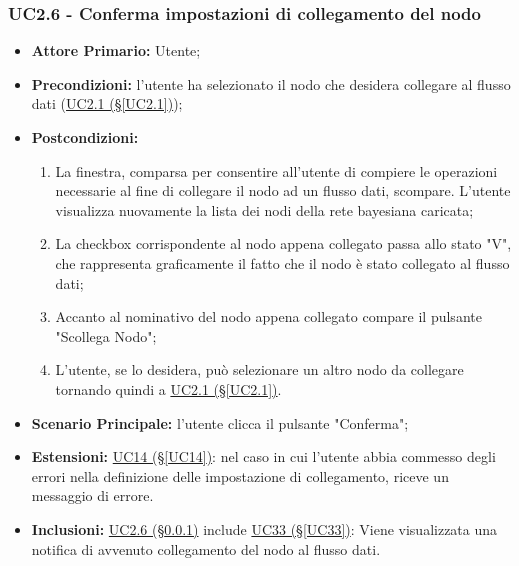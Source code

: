 \subsubsection{UC2.6 - Conferma impostazioni di collegamento del nodo}\label{UC2.6}
\begin{itemize}
\item \textbf{Attore Primario:} Utente;
\item \textbf{Precondizioni:} l'utente ha selezionato il nodo che desidera collegare al flusso dati 					(\hyperref[UC2.1]{UC2.1 (§\ref*{UC2.1})});
\item \textbf{Postcondizioni:}
	\begin{enumerate}
	\item La finestra, comparsa per consentire all'utente di compiere le operazioni necessarie al fine di collegare il 		nodo ad un flusso dati, scompare. L'utente visualizza nuovamente la lista dei nodi della rete bayesiana caricata;
	\item La checkbox corrispondente al nodo appena collegato passa allo stato "V", che rappresenta graficamente il fatto che il nodo è stato collegato al flusso dati;
	\item Accanto al nominativo del nodo appena collegato compare il pulsante "Scollega Nodo";
	\item L'utente, se lo desidera, può selezionare un altro nodo da collegare tornando quindi a \hyperref[UC2.1]{UC2.1 (§\ref*{UC2.1})}.
	\end{enumerate}
\item \textbf{Scenario Principale:} l'utente clicca il pulsante "Conferma";
\item \textbf{Estensioni:} \hyperref[UC14]{UC14 (§\ref*{UC14})}: nel caso in cui l'utente abbia commesso degli errori nella definizione delle impostazione di collegamento, riceve un messaggio di errore.
\item \textbf{Inclusioni:} \hyperref[UC2.6]{UC2.6 (§\ref*{UC2.6})} include \hyperref[UC33]{UC33 (§\ref*{UC33})}: Viene visualizzata una notifica di avvenuto collegamento del nodo al flusso dati. 
\end{itemize}

\pagebreak

